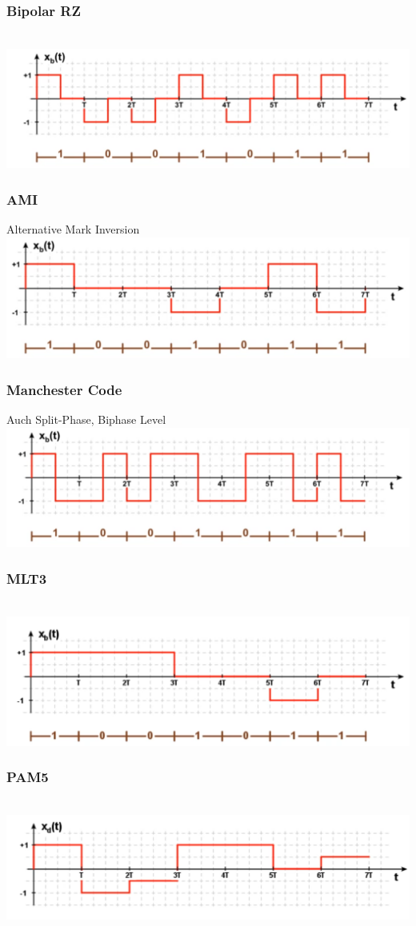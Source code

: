 \subsubsection{Bipolar RZ}\\
\includegraphics[width=0.6\columnwidth]{Images/brz}

\subsubsection{AMI}
Alternative Mark Inversion\\
\includegraphics[width=0.6\columnwidth]{Images/ami}

\subsubsection{Manchester Code}
Auch Split-Phase, Biphase Level\\
\includegraphics[width=0.6\columnwidth]{Images/manchester}

\subsubsection{MLT3}\\
\includegraphics[width=0.6\columnwidth]{Images/mlt3}

\subsubsection{PAM5}\\
\includegraphics[width=0.6\columnwidth]{Images/pam5}


